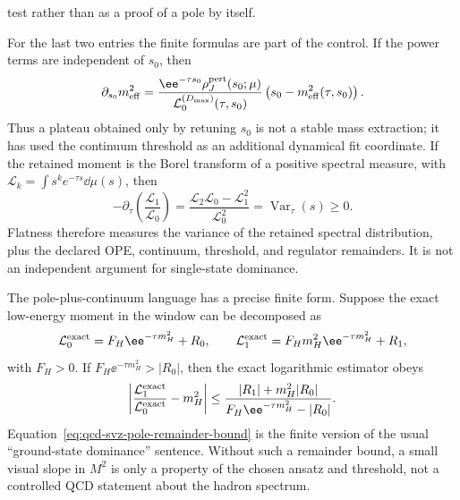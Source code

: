 \begin{controlledapproximation}
\begin{enumerate}
  test rather than as a proof of a pole by itself.
\end{enumerate}
For the last two entries the finite formulas are part of the control.  If the
power terms are independent of \(s_0\), then
\begin{equation}
  \partial_{s_0}m_{\rm eff}^2
  =
  \frac{\ee^{-\tau s_0}\rho_J^{\rm pert}(s_0;\mu)}
       {\mathcal L_0^{(D_{\max})}(\tau,s_0)}
  \left(s_0-m_{\rm eff}^2(\tau,s_0)\right).
  \label{eq:qcd-svz-threshold-sensitivity}
\end{equation}
Thus a plateau obtained only by retuning \(s_0\) is not a stable mass
extraction; it has used the continuum threshold as an additional dynamical
fit coordinate.  If the retained moment is the Borel transform of a positive
spectral measure, with
\(\mathcal L_k=\int s^k e^{-\tau s}\dd\mu(s)\), then
\begin{equation}
  -\partial_\tau
  \left(\frac{\mathcal L_1}{\mathcal L_0}\right)
  =
  \frac{\mathcal L_2\mathcal L_0-\mathcal L_1^2}{\mathcal L_0^2}
  =
  \operatorname{Var}_{\tau}(s)
  \ge 0 .
  \label{eq:qcd-svz-plateau-variance}
\end{equation}
Flatness therefore measures the variance of the retained spectral distribution,
plus the declared OPE, continuum, threshold, and regulator remainders.  It is
not an independent argument for single-state dominance.

The pole-plus-continuum language has a precise finite form.  Suppose the exact
low-energy moment in the window can be decomposed as
\begin{equation}
  \mathcal L_0^{\rm exact}
  =
  F_H\ee^{-\tau m_H^2}+R_0,
  \qquad
  \mathcal L_1^{\rm exact}
  =
  F_H m_H^2\ee^{-\tau m_H^2}+R_1 ,
  \label{eq:qcd-svz-pole-remainder-moments}
\end{equation}
with \(F_H>0\).  If
\(F_H\ee^{-\tau m_H^2}>|R_0|\), then the exact logarithmic estimator obeys
\begin{equation}
  \left|
  \frac{\mathcal L_1^{\rm exact}}{\mathcal L_0^{\rm exact}}
  -m_H^2
  \right|
  \le
  \frac{|R_1|+m_H^2|R_0|}
       {F_H\ee^{-\tau m_H^2}-|R_0|}.
  \label{eq:qcd-svz-pole-remainder-bound}
\end{equation}
Equation~\eqref{eq:qcd-svz-pole-remainder-bound} is the finite version of the
usual ``ground-state dominance'' sentence.  Without such a remainder bound, a
small visual slope in \(M^2\) is only a property of the chosen ansatz and
threshold, not a controlled QCD statement about the hadron spectrum.


\end{controlledapproximation}
